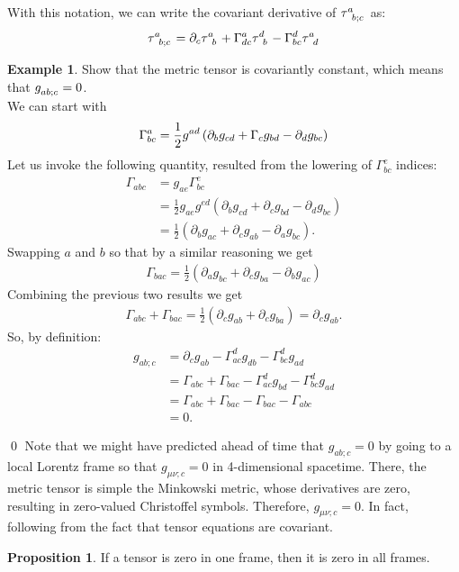 \documentclass{book}
\theoremstyle{definition}
\newtheorem{prop}{Proposition}[section]
\newtheorem{exmp}{Example}[section]
\begin{document}
With this notation, we can write the covariant derivative of $\tensor{\tau}{^a_{b;c}}$ as:
\begin{align*}
\tensor{\tau}{^a_{b;c}} = \partial_c\tensor{\tau}{^a_b} + \Gamma^a_{dc}\tensor{\tau}{^d_b} - \Gamma^d_{bc}\tensor{\tau}{^a_d}
\end{align*}

\begin{exmp}
	Show that the metric tensor is covariantly constant, which means that $\tensor{g}{_{ab;c}} = 0$.\\
	
	We can start with 
	\begin{align*}
	\Gamma^a_{bc} = \frac{1}{2}\tensor{g}{^{ad}}\left(\partial_bg_{cd} + \Gamma_cg_{bd} - \partial_dg_{bc} \right) 
	\end{align*} 
	Let us invoke the following quantity, resulted from the lowering of $\Gamma^e_{bc}$ indices:
	\begin{align*}
	\Gamma_{abc} &= g_{ae}\Gamma^e_{bc}\\
	&= \frac{1}{2}g_{ae}g^{ed}\left(\partial_bg_{cd} + \partial_cg_{bd} - \partial_dg_{bc} \right) \\
	&= \frac{1}{2}\left(\partial_bg_{ac} + \partial_cg_{ab} -\partial_ag_{bc} \right).
	\end{align*}
	Swapping $a$ and $b$ so that by a similar reasoning we get
	\begin{align*}
	\Gamma_{bac} = \frac{1}{2}\left( \partial_ag_{bc} + \partial_cg_{ba} - \partial_bg_{ac} \right) 
	\end{align*}
	Combining the previous two results we get
	\begin{align*}
	\Gamma_{abc} + \Gamma_{bac} = \frac{1}{2}\left( \partial_cg_{ab} + \partial_cg_{ba}\right) = \partial_cg_{ab}. 
	\end{align*}
	So, by definition:
	\begin{align*}
	g_{ab;c} &= \partial_cg_{ab} - \Gamma^d_{ac}g_{db} - \Gamma^d_{bc}g_{ad}\\
	&= \Gamma_{abc} + \Gamma_{bac} - \Gamma^d_{ac}g_{bd} - \Gamma^d_{bc}g_{ad}\\
	&= \Gamma_{abc} + \Gamma_{bac} - \Gamma_{bac} - \Gamma_{abc}\\
	&= 0.
	\end{align*}
\end{exmp}\qed
Note that we might have predicted ahead of time that $g_{ab;c} = 0$ by going to a local Lorentz frame so that $g_{\mu\nu;c} = 0$ in 4-dimensional spacetime. There, the metric tensor is simple the Minkowski metric, whose derivatives are zero, resulting in zero-valued Christoffel symbols. Therefore, $g_{\mu\nu;c} = 0$. In fact, following from the fact that tensor equations are covariant. 
\begin{prop}
	If a tensor is zero in one frame, then it is zero in all frames. 
\end{prop}
\end{document}
